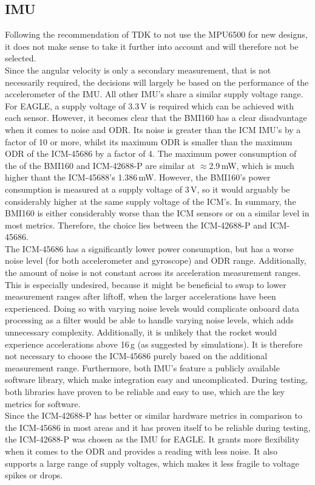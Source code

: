 \documentclass[fontsize=11pt,%
twoside,%
BCOR          = 8mm, %
DIV           = 11,  %
titlepage     = off,%
index=totoc,%
xcolor        = pdftex,%
dvipsnames,%
bibliography  = totoc,%
bibliography = numbered, %
listof        = notnumbered]{scrreprt}
\begin{document}
\subsection{IMU}
Following the recommendation of TDK to not use the MPU6500 for new designs, it does not make sense to take it further into account and will therefore not be selected.\\
Since the angular velocity is only a secondary measurement, that is not necessarily required, the decisions will largely be based on the performance of the accelerometer of the IMU.
All other IMU's share a similar supply voltage range. For EAGLE, a supply voltage of 3.3\,V is required which can be achieved with each sensor. However, it becomes clear that the BMI160 has a clear disadvantage when it comes to noise and ODR. Its noise is greater than the ICM IMU's by a factor of 10 or more, whilst its maximum ODR is smaller than the maximum ODR of the ICM-45686 by a factor of 4. The maximum power consumption of the of the BMI160 and ICM-42688-P are similar at $\approx$2.9\,mW, which is much higher thant the ICM-45688's 1.386\,mW. However, the BMI160's power consumption is measured at a supply voltage of 3\,V, so it would arguably be considerably higher at the same supply voltage of the ICM's. In summary, the BMI160 is either considerably worse than the ICM sensors or on a similar level in most metrics. Therefore, the choice lies between the ICM-42688-P and ICM-45686.\\
The ICM-45686 has a significantly lower power consumption, but has a worse noise level (for both accelerometer and gyroscope) and ODR range. Additionally, the amount of noise is not constant across its acceleration measurement ranges. This is especially undesired, because it might be beneficial to swap to lower measurement ranges after liftoff, when the larger accelerations have been experienced. Doing so with varying noise levels would complicate onboard data processing as a filter would be able to handle varying noise levels, which adds unnecessary complexity. Additionally, it is unlikely that the rocket would experience accelerations above 16\,g (as suggested by simulations). It is therefore not necessary to choose the ICM-45686 purely based on the additional measurement range. Furthermore, both IMU's feature a publicly available software library, which make integration easy and uncomplicated. During testing, both libraries have proven to be reliable and easy to use, which are the key metrics for software.\\
Since the ICM-42688-P has better or similar hardware metrics in comparison to the ICM-45686 in most areas and it has proven itself to be reliable during testing, the ICM-42688-P was chosen as the IMU for EAGLE. It grants more flexibility when it comes to the ODR and provides a reading with less noise. It also supports a large range of supply voltages, which makes it less fragile to voltage spikes or drops.
\end{document}
